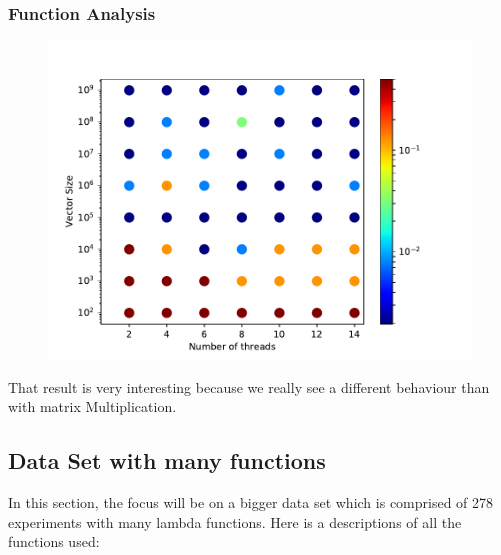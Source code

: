 \documentclass[12pt]{article}
\begin{document}
\subsubsection{Function Analysis}
\begin{figure}[h]
	\centering
	\includegraphics[scale=0.8]{images/stencil_function.pdf}
\end{figure}
That result is very interesting because we really see a different behaviour than with matrix Multiplication.


\subsection{Data Set with many functions}
In this section, the focus will be on a bigger data set which is comprised of 278 experiments with many lambda functions. Here is a descriptions of all the functions used:
\end{document}
